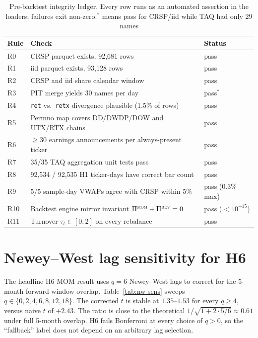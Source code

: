 \documentclass[10pt,conference,compsoc]{IEEEtran}
\newcommand{\MOM}{\textsc{mom}}  \newcommand{\REV}{\textsc{rev}}
\begin{document}
\begin{table}[ht]
\centering
\caption{Pre-backtest integrity ledger. Every row runs as an
automated assertion in the loaders; failures exit non-zero.$^*$ means pass for CRSP/iid while TAQ had only 29 names}
\label{tab:ledger}
\scriptsize
\begin{tabular}{@{}l l l@{}}
\toprule
Rule & Check & Status \\
\midrule
R0 & CRSP parquet exists, 92{,}681 rows & pass \\
R1 & iid parquet exists, 93{,}128 rows  & pass \\
R2 & CRSP and iid share calendar window & pass \\
R3 & PIT merge yields 30 names per day  & pass$^*$ \\
R4 & \texttt{ret} vs.\ \texttt{retx} divergence plausible (1.5\% of rows) & pass \\
R5 & Permno map covers DD/DWDP/DOW and UTX/RTX chains & pass \\
R6 & $\geq$30 earnings announcements per always-present ticker & pass \\
R7 & 35/35 TAQ aggregation unit tests pass & pass \\
R8 & 92{,}534 / 92{,}535 H1 ticker-days have correct bar count & pass \\
R9 & 5/5 sample-day VWAPs agree with CRSP within 5\% & pass (0.3\% max) \\
R10 & Backtest engine mirror invariant $\Pi^{\MOM}+\Pi^{\REV}=0$ & pass ($<10^{-15}$) \\
R11 & Turnover $\tau_t \in [0, 2]$ on every rebalance & pass \\
\bottomrule
\end{tabular}
\end{table}

\section{Newey--West lag sensitivity for H6}
\label{app:nw}

The headline H6 MOM result uses $q=6$ Newey--West lags to correct
for the 5-month forward-window overlap. Table~\ref{tab:nw-sens}
sweeps $q \in \{0, 2, 4, 6, 8, 12, 18\}$. The corrected $t$ is
stable at $1.35$--$1.53$ for every $q \geq 4$, versus naive $t$ of
$+2.43$. The ratio is close to the theoretical $1/\sqrt{1+2\cdot5/6}
\approx 0.61$ under full 5-month overlap. H6 fails Bonferroni at
every choice of $q > 0$, so the ``fallback'' label does not depend
on an arbitrary lag selection.
\end{document}
